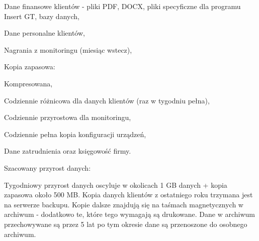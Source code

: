 \begin{minipage}[\right]{15cm}
	\begin{itemize*}
		\item Dane finansowe klientów - pliki PDF, DOCX, pliki specyficzne dla programu Insert GT, bazy danych,
		\item Dane personalne klientów,
		\item Nagrania z monitoringu (miesiąc wstecz),
		\item Kopia zapasowa:
		\begin{itemize*}
			\item Kompresowana,
			\item Codziennie różnicowa dla danych klientów (raz w tygodniu pełna),
			\item Codziennie przyrostowa dla monitoringu,
			\item Codziennie pełna kopia konfiguracji urządzeń,
		\end{itemize*}
		\item Dane zatrudnienia oraz księgowość firmy.
	\end{itemize*}
\end{minipage}

Szacowany przyrost danych:

Tygodniowy przyrost danych oscyluje w okolicach 1 GB danych + kopia zapasowa około 500 MB. Kopia danych klientów z ostatniego roku trzymana jest na serwerze backupu. Kopie dalsze znajdują się na taśmach magnetycznych w archiwum - dodatkowo te, które tego wymagają są drukowane. Dane w archiwum przechowywane są przez 5 lat po tym okresie dane są przenoszone do osobnego archiwum.
